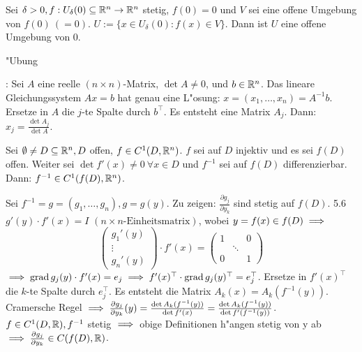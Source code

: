 \documentclass[a4paper,twoside,DIV15,BCOR12mm]{scrbook}
\begin{document}
\begin{wichtigerhilfssatz}
Sei $\delta>0, f:U_\delta(0)\subseteq\mathbb{R}^n\to\mathbb{R}^n$ stetig, $f(0)=0$ und $V$ sei eine offene Umgebung von $f(0)\ (=0)$. $U:=\{x\in U_\delta(0):f(x)\in V\}$. Dann ist $U$ eine offene Umgebung von $0$.
\end{wichtigerhilfssatz}
\begin{beweis}
"Ubung
\end{beweis}

\begin{erinnerung}
: Sei $A$ eine reelle $(n\times n)$-Matrix, $\det A\ne 0$, und $b\in\mathbb{R}^n$. Das lineare Gleichungssystem $Ax=b$ hat genau eine L"osung: $x=(x_1,\ldots,x_n)=A^{-1}b$. Ersetze in $A$ die $j$-te Spalte durch $b^\top$. Es entsteht eine Matrix $A_j$. Dann: $x_j=\frac{\det A_j}{\det A}$.
\end{erinnerung}

\begin{satz}
Sei $\emptyset\ne D\subseteq \mathbb{R}^n, D$ offen, $f\in C^1(D,\mathbb{R}^n)$. $f$ sei auf $D$ injektiv und es sei $f(D)$ offen. Weiter sei $\det f'(x)\ne 0\ \forall x\in D$ und $f^{-1}$ sei auf $f(D)$ differenzierbar. Dann: $f^{-1}\in C^1(f(D),\mathbb{R}^n)$.
\end{satz}

\begin{beweis}
Sei $f^{-1}=g=(g_1,\ldots,g_n), g=g(y)$. Zu zeigen: $\frac{\partial g_j}{\partial y_k}$ sind stetig auf $f(D)$. 5.6\folgt $g'(y)\cdot f'(x)=I$ $(n\times n\text{-Einheitsmatrix})$, wobei $y=f(x)\in f(D)\implies$
$$
\begin{pmatrix}
g_1'(y)\\
\vdots\\
g_n'(y)
\end{pmatrix}\cdot f'(x)=
\begin{pmatrix}
1 & & 0 \\
& \ddots &\\
0 & & 1
\end{pmatrix}$$
$\implies \mathop{\rm grad}\nolimits g_j(y)\cdot f'(x)=e_j\implies f'(x)^\top\cdot \mathop{\rm grad}\nolimits g_j(y)^\top=e_j^\top$. Ersetze in $f'(x)^\top$ die $k$-te Spalte durch $e_j^\top$. Es entsteht die Matrix $A_k(x)=A_k(f^{-1}(y))$. Cramersche Regel $\implies \frac{\partial g_j}{\partial y_k}(y)=\frac{\det A_k(f^{-1}(y))}{\det f'(x)}=\frac{\det A_k(f^{-1}(y))}{\det f'(f^{-1}(y))}$. $f\in C^1(D,\mathbb{R}), f^{-1}$ stetig $\implies$ obige Definitionen h"angen stetig von y ab $\implies \frac{\partial g_j}{\partial y_k}\in C(f(D),\mathbb{R})$.
\end{beweis}
\end{document}
